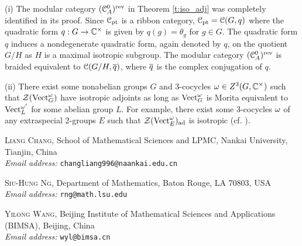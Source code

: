 \documentclass[11pt]{article}
\makeatletter
\newcommand{\authorinfo}{%
\par\bigskip
\begingroup
\footnotesize

\noindent
\textsc{Liang Chang}, School of Mathematical Sciences and LPMC, Nankai University, Tianjin, China\\
\textit{Email address:}
\texttt{changliang996@naankai.edu.cn}

\medskip
\noindent 
\textsc{Siu-Hung Ng}, Department of Mathematics, Baton Rouge, LA 70803, USA\\
\textit{Email address:}
\texttt{rng@math.lsu.edu}

\medskip
\noindent 
\textsc{Yilong Wang}, Beijing Institute of Mathematical Sciences and Applications (BIMSA), Beijing, China\\
\textit{Email address:}
\texttt{wyl@bimsa.cn}

\endgroup
}
\makeatother
\begin{document}
\begin{remark}
(i) The modular category $({\mathcal{C}}_A^0)^{\operatorname{rev}}$ in Theorem \ref{t:iso_adj} was completely identified in its proof. Since $\mathcal{C}_{\operatorname{pt}}$ is a ribbon category, $\mathcal{C}_{\operatorname{pt}} = {\mathcal{C}}(G,q)$ where the quadratic form $q: G \rightarrow {\mathbb{C}}^\times$ is given by $q(g) = \theta_g$ for $g \in G$.  The quadratic form $q$ induces a nondegenerate quadratic form, again denoted by $q$, on the quotient $G/H$ as $H$ is a maximal isotropic subgroup. The modular category $(\mathcal{C}_A^0)^{\operatorname{rev}}$ is braided equivalent to ${\mathcal{C}}(G/H,\overline{q})$, where $\overline{q}$ is the complex conjugation of $q$.  

(ii) There exist some nonabelian groups $G$ and 3-cocycles $\omega \in Z^3(G, \mathbb{C}^\times)$ such that $\zdr(\Vec_G^\w)$ have isotropic adjoints as long as ${\operatorname{Vect}}_G^\omega$ is Morita equivalent to  ${\operatorname{Vect}}_L^{\omega'}$ for some abelian group $L$. For example, there exist some 3-cocycles $\omega$ of any extraspecial 2-groups $E$ such that $\zdr(\Vec_E^\w)_\ad$ is isotropic  (cf. \cite[Thm. 4.6 and Thm. 5.2]{GMN07}).
\end{remark}


\begingroup
\small


\endgroup

\authorinfo
\end{document}

